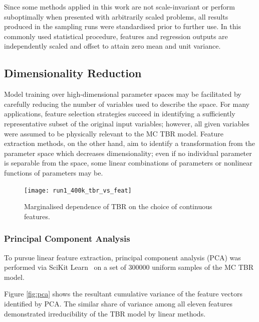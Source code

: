 Since some methods applied in this work are not scale-invariant or
perform suboptimally when presented with arbitrarily scaled problems, all results
produced in the sampling runs were standardised prior to further use. In this
commonly used statistical procedure, features and regression outputs are
independently scaled and offset to attain zero mean and unit variance.



\subsection{Dimensionality Reduction}
\label{sec:dimred}


Model training over high-dimensional parameter spaces may be facilitated by carefully reducing the number of variables used to describe the space. For many applications, feature selection strategies succeed in identifying a sufficiently representative subset of the original input variables; however, all given variables were assumed to be physically relevant to the MC TBR model. Feature extraction methods, on the other hand, aim to identify a transformation from the parameter space which decreases dimensionality; even if no individual parameter is separable from the space, some linear combinations of parameters or nonlinear functions of parameters may be.

\begin{figure}[h]
	\centering
	\texttt{[image: run1\_400k\_tbr\_vs\_feat]}
	\caption{Marginalised dependence of TBR on the choice of continuous
	features.}
  \label{fig:tbr-vs-features}
\end{figure}

\subsubsection{Principal Component Analysis}

To pursue linear feature extraction, principal component analysis (PCA)
\cite{Jolliffe2016} was performed via SciKit Learn~\cite{scikit-learn} on a set
of \num{300000} uniform samples of the MC TBR model. %

Figure \cref{fig:pca} shows the resultant cumulative variance of the feature vectors identified by PCA. The similar share of variance among all eleven features demonstrated irreducibility of the TBR model by linear methods.

